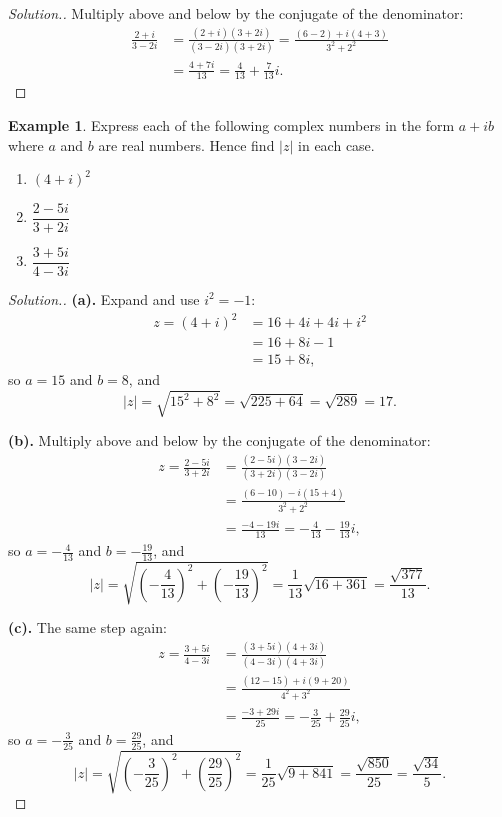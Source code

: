 \documentclass[11pt,a4paper]{article}
\theoremstyle{definition}
\newtheorem{example}[thm]{Example}
\newenvironment{solution}
  {\renewcommand{\qedsymbol}{}\begin{proof}[\textit{Solution}.]}
  {\end{proof}}
\begin{document}
\begin{solution}
Multiply above and below by the conjugate of the denominator:
\begin{align*}
\frac{2+i}{3-2i} & = \frac{(2+i)(3+2i)}{(3-2i)(3+2i)}
                   = \frac{(6-2)+i(4+3)}{3^{2}+2^{2}}\\
                 & = \frac{4+7i}{13}
                   = \frac{4}{13}+\frac{7}{13}i .
\end{align*}
\end{solution}
\begin{example}

Express each of the following complex numbers in the form $a+ib$ where $a$ and $b$ are real numbers. Hence find $|z|$ in each  case.
\begin{enumerate}
\item[(a).] $(4+i)^{2}$
\item[(b).] $\dfrac{2-5i}{3+2i}$
\item[(c).] $\dfrac{3+5i}{4-3i}$
\end{enumerate}
\end{example}
\begin{solution}

\textbf{(a).} Expand and use $i^{2}=-1$:
\begin{align*}
z=(4+i)^{2} & = 16+4i+4i+i^{2}\\
            & = 16+8i-1\\
            & = 15+8i,
\end{align*}
so $a=15$ and $b=8$, and
$$|z|=\sqrt{15^{2}+8^{2}}=\sqrt{225+64}=\sqrt{289}=17 .$$

\textbf{(b).} Multiply above and below by the conjugate of the denominator:
\begin{align*}
z=\frac{2-5i}{3+2i}
  & = \frac{(2-5i)(3-2i)}{(3+2i)(3-2i)}\\
  & = \frac{(6-10)-i(15+4)}{3^{2}+2^{2}}\\
  & = \frac{-4-19i}{13}
    = -\frac{4}{13}-\frac{19}{13}i,
\end{align*}
so $a=-\frac{4}{13}$ and $b=-\frac{19}{13}$, and
$$|z|=\sqrt{\left(-\frac{4}{13}\right)^{2}+\left(-\frac{19}{13}\right)^{2}}
=\frac{1}{13}\sqrt{16+361}=\frac{\sqrt{377}}{13} .$$

\textbf{(c).} The same step again:
\begin{align*}
z=\frac{3+5i}{4-3i}
  & = \frac{(3+5i)(4+3i)}{(4-3i)(4+3i)}\\
  & = \frac{(12-15)+i(9+20)}{4^{2}+3^{2}}\\
  & = \frac{-3+29i}{25}
    = -\frac{3}{25}+\frac{29}{25}i,
\end{align*}
so $a=-\frac{3}{25}$ and $b=\frac{29}{25}$, and
$$|z|=\sqrt{\left(-\frac{3}{25}\right)^{2}+\left(\frac{29}{25}\right)^{2}}
=\frac{1}{25}\sqrt{9+841}=\frac{\sqrt{850}}{25}=\frac{\sqrt{34}}{5} .$$
\end{solution}
\end{document}
